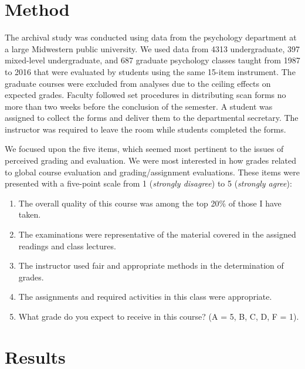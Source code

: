 \documentclass[man]{apa6}
\providecommand{\tightlist}{%
  \setlength{\itemsep}{0pt}\setlength{\parskip}{0pt}}
\theoremstyle{definition}
\theoremstyle{definition}
\theoremstyle{definition}
\theoremstyle{remark}
\begin{document}
\section{Method}\label{method}

The archival study was conducted using data from the psychology
department at a large Midwestern public university. We used data from
4313 undergraduate, 397 mixed-level undergraduate, and 687 graduate
psychology classes taught from 1987 to 2016 that were evaluated by
students using the same 15-item instrument. The graduate courses were
excluded from analyses due to the ceiling effects on expected grades.
Faculty followed set procedures in distributing scan forms no more than
two weeks before the conclusion of the semester. A student was assigned
to collect the forms and deliver them to the departmental secretary. The
instructor was required to leave the room while students completed the
forms.

We focused upon the five items, which seemed most pertinent to the
issues of perceived grading and evaluation. We were most interested in
how grades related to global course evaluation and grading/assignment
evaluations. These items were presented with a five-point scale from 1
(\emph{strongly disagree}) to 5 (\emph{strongly agree}):

\begin{enumerate}
\def\labelenumi{\arabic{enumi})}
\tightlist
\item
  The overall quality of this course was among the top 20\% of those I
  have taken.
\item
  The examinations were representative of the material covered in the
  assigned readings and class lectures.
\item
  The instructor used fair and appropriate methods in the determination
  of grades.
\item
  The assignments and required activities in this class were
  appropriate.
\item
  What grade do you expect to receive in this course? (A = 5, B, C, D, F
  = 1).
\end{enumerate}

\section{Results}\label{results}
\end{document}
